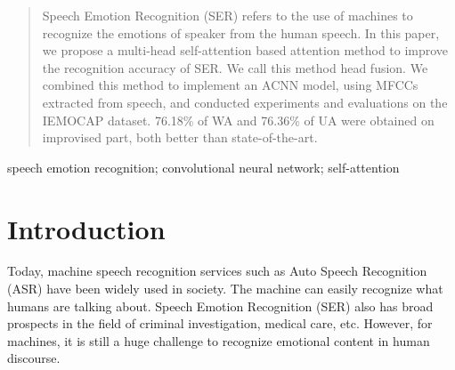 \documentclass[10pt, conference, compsocconf]{IEEEtran}
\begin{document}
\begin{abstract}
Speech Emotion Recognition (SER) refers to the use of machines to recognize the emotions of speaker from the human speech. In this paper, we propose a multi-head self-attention based attention method to improve the recognition accuracy of SER. We call this method head fusion. We combined this method to implement an ACNN model, using MFCCs extracted from speech, and conducted experiments and evaluations on the IEMOCAP dataset. 76.18\% of WA and 76.36\% of UA were obtained on improvised part, both better than state-of-the-art.
\end{abstract}

\begin{IEEEkeywords}
speech emotion recognition; convolutional neural network; self-attention
\end{IEEEkeywords}


%
\IEEEpeerreviewmaketitle



\section{Introduction}
%
Today, machine speech recognition services such as Auto Speech Recognition (ASR) have been widely used in society. The machine can easily recognize what humans are talking about. Speech Emotion Recognition (SER) also has broad prospects in the field of criminal investigation, medical care, etc. However, for machines, it is still a huge challenge to recognize emotional content in human discourse.
\end{document}
